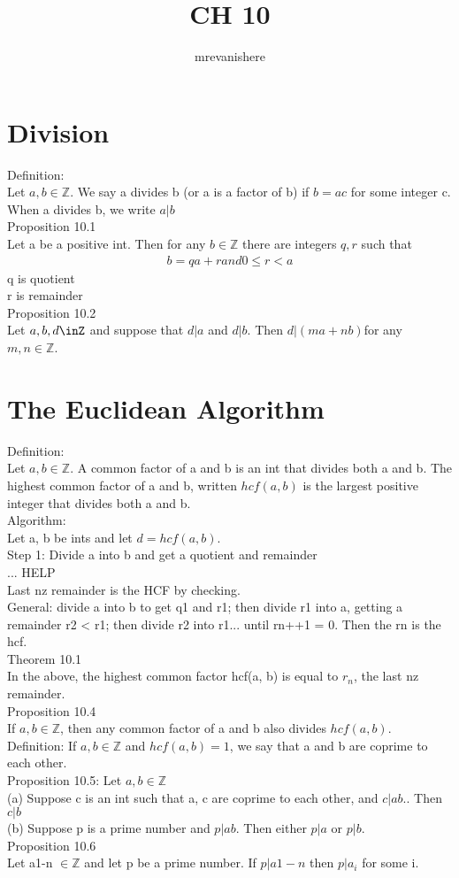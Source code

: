 \documentclass[12pt]{article}
\newcommand{\Z}{\mathbb{Z}}
\begin{document}
\title{CH 10}
\author{mrevanishere}
\maketitle


\section{Division}
	Definition:\\
	Let $ a, b\in\Z $. We say a divides b (or a is a factor of b) if 
	$ b = ac $ for some integer c. When a divides b, we write $ a|b $ \\
	Proposition 10.1 \\
	Let a be a positive int. Then for any $ b\in\Z $ there are integers $ q,r $
	such that
	\begin{align*}
		b=qa + r and 0 \le r < a
	\end{align*}
	q is quotient \\
	r is remainder\\
	Proposition 10.2 \\
	Let $ a, b, d\inZ $ and suppose that $ d|a $ and $ d|b $. Then
	$ d|(ma+nb) $for any $ m, n\in\Z $.
\section{The Euclidean Algorithm} 
	Definition:\\
	Let $ a, b\in\Z $. A common factor of a and b is an int that divides both
	a and b. The highest common factor of a and b, written
	$ hcf(a, b) $ is the largest positive integer that divides both a and b.\\
	Algorithm:\\
	Let a, b be ints and let $ d = hcf(a, b) $.\\
	Step 1: Divide a into b and get a quotient and remainder \\
	... HELP \\
	Last nz remainder is the HCF by checking. \\
	General: divide a into b to get q1 and r1; then divide r1 into a,
	getting a remainder r2 < r1; then divide r2 into r1... until 
	rn++1 = 0. Then the rn is the hcf.\\
	Theorem 10.1 \\
	In the above, the highest common factor hcf(a, b) is equal to $ r_n $, 
	the last nz remainder.\\
	Proposition 10.4 \\
	If $ a, b\in\Z $, then any common factor of a and b also divides 
	$ hcf(a, b) $.\\
	Definition: If $ a,b \in\Z $ and $ hcf(a, b) = 1 $, we say that a and b 
	are coprime to each other. \\
	Proposition 10.5: Let $ a, b\in\Z $ \\
	(a) Suppose c is an int such that a, c are coprime to each other,
	and $ c|ab. $. Then $ c|b $ \\
	(b) Suppose p is a prime number and $ p|ab $. Then either $ p|a $ or
	$ p|b $. \\
	Proposition 10.6 \\
	Let a1-n $ \in\Z $ and let p be a prime number. If $ p|a1-n $ then
	$ p|a_i $ for some i.
\end{document}
